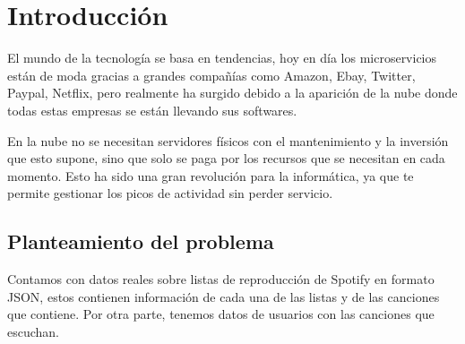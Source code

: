 \documentclass[12pt]{report} %
\begin{document}
\vfill

\newpage %
\thispagestyle{empty}
\mbox{}
	


\tableofcontents
\thispagestyle{fancy}

\newpage %
\thispagestyle{empty}
\mbox{}

\listoffigures
\thispagestyle{fancy}

\newpage %
\thispagestyle{empty}
\mbox{}

\listoftables
\thispagestyle{fancy}

\newpage %
\thispagestyle{empty}
\mbox{}


\clearpage
{} %

\chapter{Introducción}

	El mundo de la tecnología se basa en tendencias, hoy en día los microservicios están de moda gracias a grandes compañías como Amazon, Ebay, Twitter, Paypal, Netflix, pero realmente ha surgido debido a la aparición de la nube donde todas estas empresas se están llevando sus softwares.
	
	En la nube no se necesitan servidores físicos con el mantenimiento y la inversión que esto supone, sino que solo se paga por los recursos que se necesitan en cada momento. Esto ha sido una gran revolución para la informática, ya que te permite gestionar los picos de actividad sin perder servicio.
	
	
	\section{Planteamiento del problema}
	Contamos con datos reales sobre listas de reproducción de Spotify en formato JSON, estos contienen información de cada una de las listas y de las canciones que contiene.
	Por otra parte, tenemos datos de usuarios con las canciones que escuchan.
\end{document}
